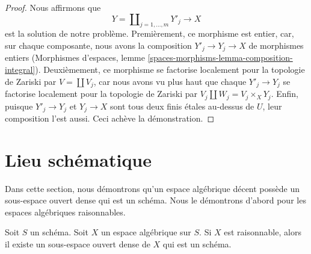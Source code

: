 \begin{proof}
\medskip\noindent
Nous affirmons que
$$
Y = \coprod\nolimits_{j = 1, \ldots, m} Y'_j \longrightarrow X
$$
est la solution de notre problème. Premièrement, ce morphisme est entier,
car, sur chaque composante, nous avons la composition $Y'_j \to Y_j \to X$ de
morphismes entiers (Morphismes d'espaces, lemme
\ref{spaces-morphisms-lemma-composition-integral}). Deuxièmement, ce morphisme
se factorise localement pour la topologie de Zariski par
$V = \coprod V_j$, car nous avons vu plus haut que chaque
$Y'_j \to Y_j$ se factorise localement pour la topologie de Zariski par
$V_j \amalg W_j = V_j \times_X Y_j$. Enfin, puisque $Y'_j \to Y_j$ et
$Y_j \to X$ sont tous deux finis étales au-dessus de $U$, leur composition
l'est aussi. Ceci achève la démonstration.
\end{proof}



















\section{Lieu schématique}
\label{section-schematic}

\noindent
Dans cette section, nous démontrons qu'un espace algébrique décent possède un
sous-espace ouvert dense qui est un schéma. Nous le démontrons d'abord pour
les espaces algébriques raisonnables.


\begin{proposition}
\label{proposition-reasonable-open-dense-scheme}
Soit $S$ un schéma. Soit $X$ un espace algébrique sur $S$.
Si $X$ est raisonnable, alors il existe un sous-espace ouvert dense de $X$
qui est un schéma.
\end{proposition}


